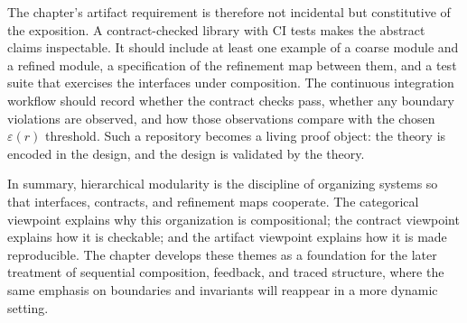 The chapter’s artifact requirement is therefore not incidental but constitutive of the exposition. A contract-checked library with CI tests makes the abstract claims inspectable. It should include at least one example of a coarse module and a refined module, a specification of the refinement map between them, and a test suite that exercises the interfaces under composition. The continuous integration workflow should record whether the contract checks pass, whether any boundary violations are observed, and how those observations compare with the chosen \(\varepsilon(r)\) threshold. Such a repository becomes a living proof object: the theory is encoded in the design, and the design is validated by the theory.

In summary, hierarchical modularity is the discipline of organizing systems so that interfaces, contracts, and refinement maps cooperate. The categorical viewpoint explains why this organization is compositional; the contract viewpoint explains how it is checkable; and the artifact viewpoint explains how it is made reproducible. The chapter develops these themes as a foundation for the later treatment of sequential composition, feedback, and traced structure, where the same emphasis on boundaries and invariants will reappear in a more dynamic setting.

